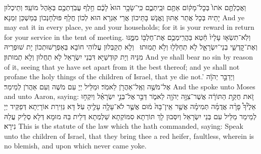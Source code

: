 {וַאֲכַלְתֶּ֤ם אֹתוֹ֙ בְּכׇל־מָק֔וֹם אַתֶּ֖ם וּבֵֽיתְכֶ֑ם כִּֽי־שָׂכָ֥ר הוּא֙ לָכֶ֔ם חֵ֥לֶף עֲבֹֽדַתְכֶ֖ם בְּאֹ֥הֶל מוֹעֵֽד׃
}
{וְתֵיכְלוּן יָתֵיהּ בְּכָל אֲתַר אַתּוּן וֶאֱנָשׁ בָּתֵּיכוֹן אֲרֵי אַגְרָא הוּא לְכוֹן חֲלָף פּוּלְחָנְכוֹן בְּמַשְׁכַּן זִמְנָא׃}
{And ye may eat it in every place, ye and your households; for it is your reward in return for your service in the tent of meeting.}{}
{וְלֹֽא־תִשְׂא֤וּ עָלָיו֙ חֵ֔טְא בַּהֲרִֽימְכֶ֥ם אֶת־חֶלְבּ֖וֹ מִמֶּ֑נּוּ וְאֶת־קׇדְשֵׁ֧י בְנֵי־יִשְׂרָאֵ֛ל לֹ֥א תְחַלְּל֖וּ וְלֹ֥א תָמֽוּתוּ׃ \petucha 
{}}
{וְלָא תְקַבְּלוּן עֲלוֹהִי חוֹבָא בְּאַפְרָשׁוּתְכוֹן יָת שׁוּפְרֵיהּ מִנֵּיהּ וְיָת קוּדְשַׁיָּא דִּבְנֵי יִשְׂרָאֵל לָא תַחֲלוּן וְלָא תְמוּתוּן׃}
{And ye shall bear no sin by reason of it, seeing that ye have set apart from it the best thereof; and ye shall not profane the holy things of the children of Israel, that ye die not.’}{}
\newperek
{}
{וַיְדַבֵּ֣ר יְהֹוָ֔ה אֶל־מֹשֶׁ֥ה וְאֶֽל־אַהֲרֹ֖ן לֵאמֹֽר׃}
{וּמַלֵּיל יְיָ עִם מֹשֶׁה וְעִם אַהֲרֹן לְמֵימַר׃}
{And the \lord\space spoke unto Moses and unto Aaron, saying:}{}
{זֹ֚את חֻקַּ֣ת הַתּוֹרָ֔ה אֲשֶׁר־צִוָּ֥ה יְהֹוָ֖ה לֵאמֹ֑ר דַּבֵּ֣ר \legarmeh  אֶל־בְּנֵ֣י יִשְׂרָאֵ֗ל וְיִקְח֣וּ אֵלֶ֩יךָ֩ פָרָ֨ה אֲדֻמָּ֜ה תְּמִימָ֗ה אֲשֶׁ֤ר אֵֽין־בָּהּ֙ מ֔וּם אֲשֶׁ֛ר לֹא־עָלָ֥ה עָלֶ֖יהָ עֹֽל׃
}
{דָּא גְּזֵירַת אוֹרָיְתָא דְּפַקֵּיד יְיָ לְמֵימַר מַלֵּיל עִם בְּנֵי יִשְׂרָאֵל וְיִסְּבוּן לָךְ תּוֹרְתָא סִמּוֹקְתָא שַׁלְמְתָא דְּלֵית בַּהּ מוּמָא דְּלָא סְלֵיק עֲלַהּ נִירָא׃}
{This is the statute of the law which the \lord\space hath commanded, saying: Speak unto the children of Israel, that they bring thee a red heifer, faultless, wherein is no blemish, and upon which never came yoke.}{}
